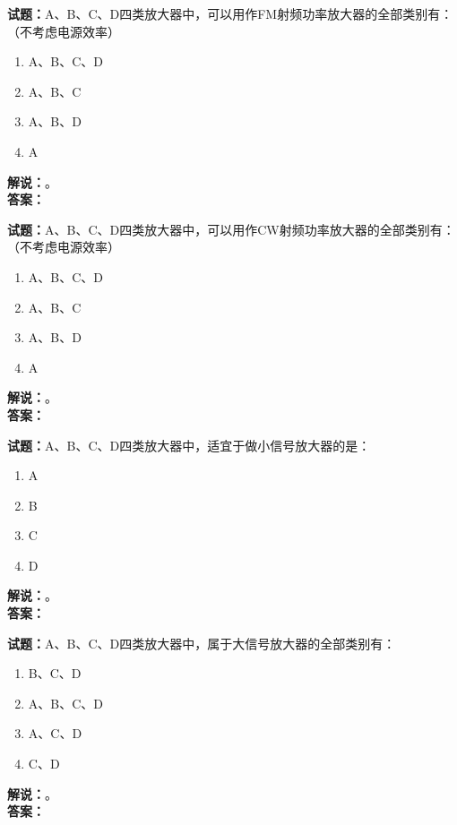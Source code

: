 \documentclass{ctexbook}
\begin{document}
\bigskip




\noindent\textbf{试题：}A、B、C、D四类放大器中，可以用作FM射频功率放大器的全部类别有： （不考虑电源效率）
\begin{enumerate}[leftmargin=3em]
\item A、B、C、D
\item A、B、C
\item A、B、D
\item A
\end{enumerate}
\noindent\textbf{解说：}\textbf{}。\\\noindent\textbf{答案：}

\bigskip




\noindent\textbf{试题：}A、B、C、D四类放大器中，可以用作CW射频功率放大器的全部类别有： （不考虑电源效率）
\begin{enumerate}[leftmargin=3em]
\item A、B、C、D
\item A、B、C
\item A、B、D
\item A
\end{enumerate}
\noindent\textbf{解说：}\textbf{}。\\\noindent\textbf{答案：}

\bigskip




\noindent\textbf{试题：}A、B、C、D四类放大器中，适宜于做小信号放大器的是：
\begin{enumerate}[leftmargin=3em]
\item A
\item B
\item C
\item D
\end{enumerate}
\noindent\textbf{解说：}\textbf{}。\\\noindent\textbf{答案：}

\bigskip




\noindent\textbf{试题：}A、B、C、D四类放大器中，属于大信号放大器的全部类别有：
\begin{enumerate}[leftmargin=3em]
\item B、C、D
\item A、B、C、D
\item A、C、D
\item C、D
\end{enumerate}
\noindent\textbf{解说：}\textbf{}。\\\noindent\textbf{答案：}
\end{document}

